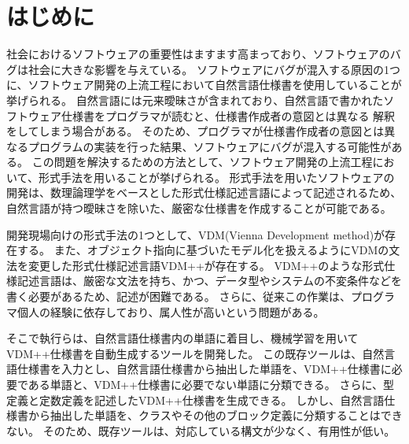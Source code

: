 \chapter{はじめに}
\label{cha:Introduction}

社会におけるソフトウェアの重要性はますます高まっており、ソフトウェアのバグは社会に大きな影響を与えている\cite{cite1,cite2}。
ソフトウェアにバグが混入する原因の1つに、ソフトウェア開発の上流工程において自然言語仕様書を使用していることが挙げられる。
自然言語には元来曖昧さが含まれており、自然言語で書かれたソフトウェア仕様書をプログラマが読むと、仕様書作成者の意図とは異なる
解釈をしてしまう場合がある\cite{cite3}。
そのため、プログラマが仕様書作成者の意図とは異なるプログラムの実装を行った結果、ソフトウェアにバグが混入する可能性がある。
この問題を解決するための方法として、ソフトウェア開発の上流工程において、形式手法を用いることが挙げられる\cite{cite4}。
形式手法を用いたソフトウェアの開発は、数理論理学をベースとした形式仕様記述言語によって記述されるため、
自然言語が持つ曖昧さを除いた、厳密な仕様書を作成することが可能である\cite{cite5}。

開発現場向けの形式手法の1つとして、VDM(Vienna Development method)が存在する\cite{vdm}。
また、オブジェクト指向に基づいたモデル化を扱えるようにVDMの文法を変更した形式仕様記述言語VDM++が存在する\cite{vdm}。
VDM++のような形式仕様記述言語は、厳密な文法を持ち、かつ、データ型やシステムの不変条件などを書く必要があるため、記述が困難である。
さらに、従来この作業は、プログラマ個人の経験に依存しており、属人性が高いという問題がある。

そこで執行らは、自然言語仕様書内の単語に着目し、機械学習を用いてVDM++仕様書を自動生成するツールを開発した\cite{shigyo1,shigyo2,shigyo3,shigyo4}。
この既存ツールは、自然言語仕様書を入力とし、自然言語仕様書から抽出した単語を、VDM++仕様書に必要である単語と、VDM++仕様書に必要でない単語に分類できる。
さらに、型定義と定数定義を記述したVDM++仕様書を生成できる。
しかし、自然言語仕様書から抽出した単語を、クラスやその他のブロック定義に分類することはできない。
そのため、既存ツールは、対応している構文が少なく、有用性が低い。

